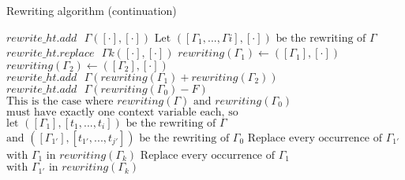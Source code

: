 \documentclass{article}
\begin{document}
\begin{algorithm}
  \caption{Rewriting algorithm (continuation)}
    \begin{algorithmic}
    \Else
            \State $rewrite\_ht.add \text{ } \Gamma \left([\cdot], [\cdot]\right)$
            \State $\text{Let } \left([\Gamma_{1}, ..., \Gamma{i}], [\cdot]\right) \text{ be the rewriting of } \Gamma$
              \State $rewrite\_ht.replace \text{ } \Gamma{k} \left([\cdot], [\cdot]\right)$
            \EndFor
          \EndIf  
        \EndIf
              \State $rewriting\left(\Gamma_{1}\right) \gets \left([\Gamma_{1}], [\cdot]\right)$
            \EndIf
              \State $rewriting\left(\Gamma_{2}\right) \gets \left([\Gamma_{2}], [\cdot]\right)$
            \EndIf  
            \State $rewrite\_ht.add \text{ } \Gamma \left(rewriting\left(\Gamma_{1}\right) + rewriting\left(\Gamma_{2}\right)\right)$
          \EndIf
        \EndIf
            \State $rewrite\_ht.add \text{ } \Gamma \left(rewriting\left(\Gamma_{0}\right) - F\right)$
          \Else
           \State $\text{This is the case where } rewriting\left(\Gamma\right) \text{ and } rewriting\left(\Gamma_{0}\right)$
            \State $\text{must have exactly one context variable each, so}$
            \State $\text{let } \left([\Gamma_{1}], [t_{1}, ..., t_{i}]\right) \text{ be the rewriting of } \Gamma$
            \State $\text{and } \left([\Gamma_{1'}], [t_{1'}, ..., t_{j'}]\right) \text{ be the rewriting of } \Gamma_{0}$
                  \State $\text{Replace every occurrence of } \Gamma_{1'}$
                  \State $\text{with } \Gamma_{1} \text{ in } \textit{rewriting}\left(\Gamma_{k}\right)$
                \EndFor
              \Else
                  \State $\text{Replace every occurrence of } \Gamma_{1}$
                  \State $\text{with } \Gamma_{1'} \text{ in } \textit{rewriting}\left(\Gamma_{k}\right)$
                \EndFor
              \EndIf
            \EndIf
          \EndIf
        \EndIf  
      \EndFor
    \EndIf
    \EndFor
    \EndFunction
\end{algorithmic}
\end{algorithm}
\end{document}
